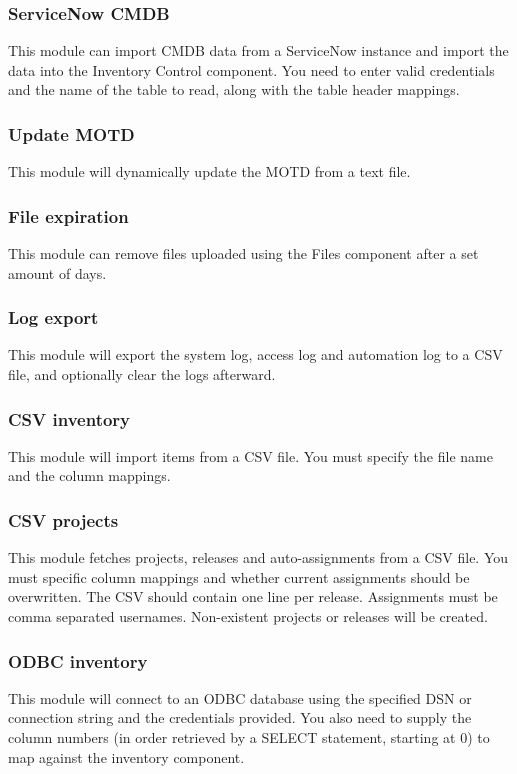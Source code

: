\documentclass[11pt]{article}
\begin{document}
\subsubsection{ServiceNow CMDB}
This module can import CMDB data from a ServiceNow instance and import the data into the Inventory Control component. You need to enter valid credentials and the name of the table to read, along with the table header mappings.

\subsubsection{Update MOTD}
This module will dynamically update the MOTD from a text file.

\subsubsection{File expiration}
This module can remove files uploaded using the Files component after a set amount of days.

\subsubsection{Log export}
This module will export the system log, access log and automation log to a CSV file, and optionally clear the logs afterward.

\subsubsection{CSV inventory}
This module will import items from a CSV file. You must specify the file name and the column mappings.

\subsubsection{CSV projects}
This module fetches projects, releases and auto-assignments from a CSV file. You must specific column mappings and whether current assignments should be overwritten. The CSV should contain one line per release. Assignments must be comma separated usernames. Non-existent projects or releases will be created.

\subsubsection{ODBC inventory}
This module will connect to an ODBC database using the specified DSN or connection string and the credentials provided. You also need to supply the column numbers (in order retrieved by a SELECT statement, starting at 0) to map against the inventory component.
\end{document}
